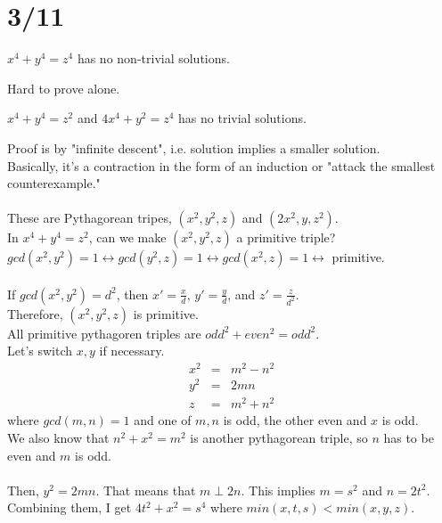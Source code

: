 \section*{3/11}
  \begin{theorem}
    $x^4 + y^4 = z^4$ has no non-trivial solutions.
  \end{theorem}
  Hard to prove alone.\\
  \begin{theorem}
    $x^4 + y^4 = z^2$ and $4x^4 + y^2 = z^4$ has no trivial solutions.
  \end{theorem}
  Proof is by "infinite descent", i.e. solution implies a smaller solution.\\
  Basically, it's a contraction in the form of an induction or "attack
  the smallest counterexample."\\\\
  These are Pythagorean tripes, $(x^2, y^2, z)$ and $(2x^2, y, z^2)$.\\
  In $x^4 + y^4 = z^2$, can we make $(x^2, y^2, z)$ a primitive triple?\\
  $gcd(x^2, y^2) = 1 \leftrightarrow gcd(y^2, z) = 1 \leftrightarrow
  gcd(x^2, z) = 1 \leftrightarrow$ primitive.\\\\
  If $gcd(x^2, y^2) = d^2$, then $x' = \frac{x}{d}$, $y' = \frac{y}{d}$, and
  $z' = \frac{z}{d^2}$.\\
  Therefore, $(x^2, y^2, z)$ is primitive.\\
  All primitive pythagoren triples are $odd^2 + even^2 = odd^2$.\\
  Let's switch $x,y$ if necessary.\\
  \begin{eqnarray*}
    x^2 & = & m^2 - n^2\\
    y^2 & = & 2mn\\
    z & = & m^2 + n^2
  \end{eqnarray*}
  where $gcd(m,n) = 1$ and one of $m,n$ is odd, the other even and $x$ is
  odd.\\
  We also know that $n^2 + x^2 = m^2$ is another pythagorean triple, so $n$ 
  has to be even and $m$ is odd.\\\\
  Then, $y^2 = 2mn$. That means that $m \perp 2n$. This implies $m = s^2$
  and $n = 2t^2$.\\
  Combining them, I get $4t^2 + x^2 = s^4$ where $min(x,t,s) <
  min(x,y,z)$.\\\\
